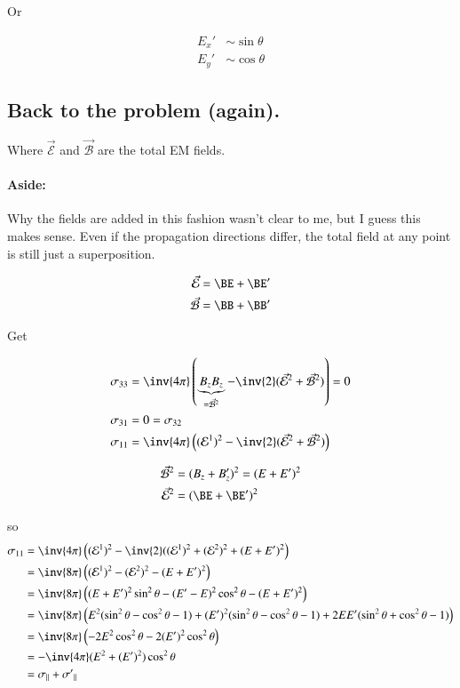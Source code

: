 Or

\begin{align}\label{eqn:relativisticElectrodynamicsT9:600}
E_x' &\sim \sin\theta \\
E_y' &\sim \cos\theta 
\end{align}

\subsection{Back to the problem (again).}

Where $\vec{\mathcal{E}}$ and $\vec{\mathcal{B}}$ are the total EM fields.

\paragraph{Aside:} Why the fields are added in this fashion wasn't clear to me, but I guess this makes sense.  Even if the propagation directions differ, the total field at any point is still just a superposition.

\begin{align}\label{eqn:relativisticElectrodynamicsT9:150}
\vec{\mathcal{E}} &= \BE + \BE' \\
\vec{\mathcal{B}} &= \BB + \BB'
\end{align}

Get 

\begin{align}\label{eqn:relativisticElectrodynamicsT9:170}
\sigma_{3 3} &= \inv{4 \pi} \left( \underbrace{B_z B_z}_{=\vec{\mathcal{B}}^2} - \inv{2} (\vec{\mathcal{E}}^2 + \vec{\mathcal{B}}^2) \right) = 0 \\
\sigma_{3 1} &= 0 = \sigma_{3 2} \\
\sigma_{1 1} &= \inv{4 \pi} \left( (\mathcal{E}^1)^2 - \inv{2} (\vec{\mathcal{E}}^2 + \vec{\mathcal{B}}^2) \right) 
\end{align}

\begin{align}\label{eqn:relativisticElectrodynamicsT9:190}
\vec{\mathcal{B}}^2 &= (B_z + B_z')^2 = (E + E')^2 \\
\vec{\mathcal{E}}^2 &= (\BE + \BE')^2
\end{align}

so
\begin{align*}
\sigma_{1 1} 
&= \inv{4 \pi} \left( (\mathcal{E}^1)^2 - \inv{2} ((\mathcal{E}^1)^2 + (\mathcal{E}^2)^2 + (E + E')^2 \right) \\
&= \inv{8 \pi} \left( (\mathcal{E}^1)^2 - (\mathcal{E}^2)^2 - (E + E')^2 \right) \\
&= \inv{8 \pi} \left( 
(E + E')^2 \sin^2\theta 
-(E' - E)^2 \cos^2\theta -(E + E')^2
\right) \\
&= \inv{8 \pi} \left( 
E^2( \sin^2\theta - \cos^2\theta - 1)
+(E')^2( \sin^2\theta - \cos^2\theta - 1)
+ 2 E E' (\sin^2\theta + \cos^2\theta -1 )
\right) \\
&= \inv{8 \pi} \left( - 2 E^2 \cos^2\theta - 2 (E')^2 \cos^2\theta \right) \\
&= -\inv{4 \pi} (E^2 + (E')^2) \cos^2\theta \\
&= \sigma_\parallel + {\sigma'}_\parallel
\end{align*}

